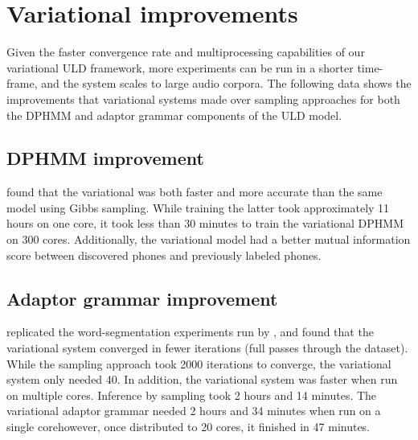 \documentclass[12pt,letterpaper]{article}
\begin{document}
\section{Variational improvements}
Given the faster convergence rate and multiprocessing capabilities of our variational ULD framework, more experiments can be run in a shorter time-frame, and the system scales to large audio corpora. The following data shows the improvements that variational systems made over sampling approaches for both the DPHMM and adaptor grammar components of the ULD model. 

\subsection{DPHMM improvement}
\citet{ondel:2016} found that the variational was both faster and more accurate than the same model using Gibbs sampling. While training the latter took approximately 11 hours on one core, it took less than 30 minutes to train the variational DPHMM on 300 cores. Additionally, the variational model had a better mutual information score between discovered phones and previously labeled phones. 

\subsection{Adaptor grammar improvement}
\citet{cohen:dissertation} replicated the word-segmentation experiments run by \citet{johnson:2008}, and found that the variational system converged in fewer iterations (full passes through the dataset). While the sampling approach took 2000 iterations to converge, the variational system only needed 40. In addition, the variational system was faster when run on multiple cores. Inference by sampling took 2 hours and 14 minutes. The variational adaptor grammar needed 2 hours and 34 minutes when run on a single core\textemdash however, once distributed to 20 cores, it finished in 47 minutes. 
\end{document}
